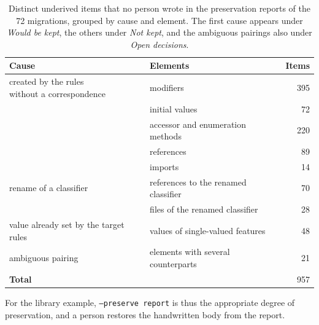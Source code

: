 \begin{table}[htbp]
    \centering
    \begin{tabular}{|l|l|r|}
        \hline
        \textbf{Cause}                        & \textbf{Elements}                    & \textbf{Items} \\
        \hline
        \makecell[l]{created by the rules                                                             \\ without a correspondence} & modifiers                  & 395            \\
        \hline
                                              & initial values                       & 72             \\
        \hline
                                              & accessor and enumeration methods     & 220            \\
        \hline
                                              & references                           & 89             \\
        \hline
                                              & imports                              & 14             \\
        \hline
        rename of a classifier                & references to the renamed classifier & 70             \\
        \hline
                                              & files of the renamed classifier      & 28             \\
        \hline
        value already set by the target rules & values of single-valued features     & 48             \\
        \hline
        ambiguous pairing                     & elements with several counterparts   & 21             \\
        \hline
        \textbf{Total}                        &                                      & 957            \\
        \hline
    \end{tabular}
    \caption{Distinct underived items that no person wrote in the preservation reports of the 72 migrations, grouped by cause and element. The first cause appears under \textit{Would be kept}, the others under \textit{Not kept}, and the ambiguous pairings also under \textit{Open decisions}.}
    \label{table:preservation-causes}
\end{table}

For the library example, \texttt{--preserve report} is thus the appropriate degree of preservation, and a person restores the handwritten body from the report.

